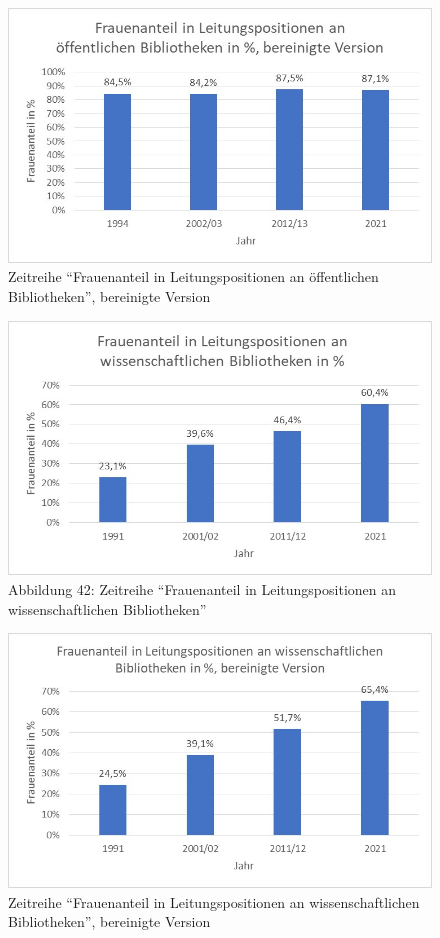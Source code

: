 \documentclass[a4paper,
fontsize=11pt,
oneside,
numbers=noperiodatend,
parskip=half-,
bibliography=totoc,
final
]{scrartcl}
\begin{document}
\begin{figure}
\centering
\includegraphics{img/Abb_41_Zeitreihe-OB_bereinigt.jpg}
\caption{Zeitreihe \enquote{Frauenanteil in Leitungspositionen an
öffentlichen Bibliotheken}, bereinigte Version}
\end{figure}

\begin{figure}
\centering
\includegraphics{img/Abb_42_Zeitreihe-WB.jpg}
\caption{Abbildung 42: Zeitreihe \enquote{Frauenanteil in
Leitungspositionen an wissenschaftlichen Bibliotheken}}
\end{figure}

\begin{figure}
\centering
\includegraphics{img/Abb_43_Zeitreihe-WB_bereinigt.jpg}
\caption{Zeitreihe \enquote{Frauenanteil in Leitungspositionen an
wissenschaftlichen Bibliotheken}, bereinigte Version}
\end{figure}
\end{document}
